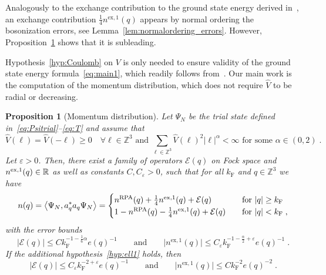 \documentclass[12pt,a4paper]{article}
\numberwithin{equation}{section}
\newcommand{\cE}{\mathcal{E}}
\newcommand{\1}{\mathbb{I}}
\newcommand{\ex}{\mathrm{ex}}
\newcommand{\F}{\mathrm{F}}
\newcommand{\RPA}{\mathrm{RPA}}
\newcommand{\kF}{k_\F}
\newcommand{\Zstar}{\mathbb{Z}^3} %
\newcommand{\Rbb}{\mathbb{R}}
\newcommand{\Z}{\mathbb{Z}}
\newcommand{\eva}[1]{\left\langle #1 \right\rangle}
\theoremstyle{plain}
\newtheorem{proposition}[theorem]{Proposition}
\theoremstyle{definition}
\theoremstyle{remark}
\theoremstyle{plain}
\theoremstyle{definition}
\theoremstyle{remark}
\begin{document}
\medskip

Analogously to the exchange contribution to the ground state energy derived in~\cite{CHN23,CHN24}, an exchange contribution $\frac{1}{4}n^{\ex,1}(q)$ appears by normal ordering the bosonization errors, see Lemma~\eqref{lem:normalordering_errors}. However, Proposition~\ref{prop:main} shows that it is subleading.

\medskip


Hypothesis~\eqref{hyp:Coulomb} on $ V $ is only needed to ensure validity of the ground state energy formula~\eqref{eq:main1}, which readily follows from~\cite{CHN23,CHN24}. Our main work is the computation of the momentum distribution, which does not require $\hat{V} $ to be radial or decreasing.

 
\begin{proposition}[Momentum distribution] \label{prop:main}
Let $ \Psi_N $ be the trial state defined in~\eqref{eq:Psitrial}--\eqref{eq:T} and assume that
\begin{equation}\label{hyp:alpha}
\hat{V}(\ell) = \hat{V}(-\ell) \ge 0 \quad \forall \ell \in \Z^3 \text{ and } \sum_{\ell \in \Zstar} \hat{V}(\ell)^2 |\ell|^\alpha < \infty \text{ for some } \alpha \in (0,2) \;.
\end{equation}
Let $\varepsilon > 0$. Then, there exist a family of operators $\mathcal{E}(q)$ on Fock space and $n^{\textnormal{ex},1}(q) \in \Rbb $  as well as constants $C, C_\varepsilon > 0 $, such that for all $ \kF $ and $ q \in \Z^3 $ we have
\begin{equation} \label{eq:main_prop_2}
	n(q) = \eva{\Psi_N, a_q^* a_q \Psi_N}
	= \begin{cases}
	n^{\RPA}(q) + \frac{1}{4}n^{\ex,1}(q) + \cE(q) & \quad
		\textnormal{for } |q| \ge \kF \\
	1 - n^{\RPA}(q) - \frac{1}{4}n^{\ex,1}(q) + \cE(q) & \quad
		\textnormal{for } |q| < \kF\;,
	\end{cases}
\end{equation}
with the error bounds
\begin{equation}
	\lvert \cE(q)\rvert \le C \kF^{-1 - \frac 16 \alpha} e(q)^{-1} \qquad \text{and} \qquad \lvert n^{\ex,1}(q)\rvert \leq C_\varepsilon \kF^{-1 -\frac{\alpha}{2} + \varepsilon } e(q)^{-1} \;.
\end{equation}
If the additional hypothesis~\eqref{hyp:ell1} holds, then
\begin{equation} \label{eq:main_prop_improvederror}
	\lvert \cE(q)\rvert \le C_\varepsilon \kF^{-2 +\varepsilon} e(q)^{-1} \qquad \text{and} \qquad
	\lvert n^{\ex,1}(q)\rvert \le
		C \kF^{-2} e(q)^{-2} \;.
\end{equation}
\end{proposition}
\end{document}
